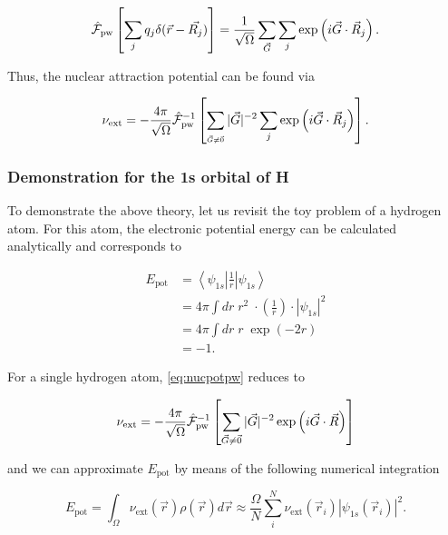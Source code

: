 \begin{equation}
    \hat{\mathcal{F}}_{\text{pw}} \left[\sum_{j} q_{j} \delta(\vec{r} - \vec{R_{j}})\right] = \frac{1}{\sqrt{\Omega}} \sum_{\vec{G}} \sum_{j} \exp \left(i \vec{G} \cdot \vec{R}_{j} \right).
\end{equation}

Thus, the nuclear attraction potential can be found via

\begin{equation}
    \nu_{\text{ext}} = -\frac{4 \pi}{\sqrt{\Omega}} \hat{\mathcal{F}}_{\text{pw}}^{-1} \left[\sum_{_{\vec{G} \neq \vec{0}}} |\vec{G}|^{-2} \sum_{j} \exp \left(i \vec{G} \cdot \vec{R}_{j} \right) \right].
    \label{eq:nucpotpw}
\end{equation}

%
%
%
\subsubsection{Demonstration for the 1s orbital of H}

To demonstrate the above theory, let us revisit the toy problem of a hydrogen atom. For this atom, the electronic potential energy can be calculated analytically and corresponds to

\begin{align}
    E_{\text{pot}} &= \left<\psi_{1s} \left| \frac{1}{r} \right| \psi_{1s}\right> \\
    &= 4 \pi \int dr \; r^{2} \; \cdot \left(\frac{1}{r}\right) \cdot |\psi_{1s}|^{2} \\
    &= 4 \pi \int dr \; r \; \exp \left(-2r \right) \\
    &= -1.
\end{align}

For a single hydrogen atom, \cref{eq:nucpotpw} reduces to

\begin{equation}
    \nu_{\text{ext}} = -\frac{4 \pi}{\sqrt{\Omega}} \hat{\mathcal{F}}_{\text{pw}}^{-1} \left[ \sum_{\vec{G} \neq \vec{0}} |\vec{G}|^{-2} \exp \left(i \vec{G} \cdot \vec{R} \right) \right]
\end{equation}

and we can approximate $E_{\text{pot}}$ by means of the following numerical integration

\begin{equation}
    E_{\text{pot}} = \int_{\Omega} \nu_{\text{ext}}(\vec{r}) \rho(\vec{r}) d\vec{r} \approx \frac{\Omega}{N} \sum_{i}^{N} \nu_{\text{ext}}(\vec{r}_{i}) |\psi_{1s}(\vec{r}_{i})|^{2}.
\end{equation}

